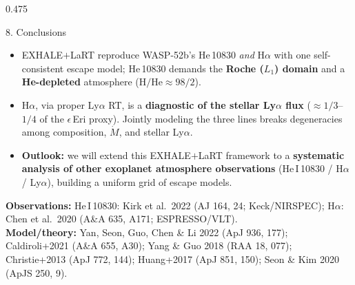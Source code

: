 \documentclass[final]{beamer}
\newlength{\colht}\setlength{\colht}{0.848\paperheight}
\newcommand{\Mdot}{\dot{M}}
\begin{document}
\begin{frame}[t]{}
\begin{columns}[t]
\begin{column}{0.475\paperwidth}
\begin{minipage}[t][\colht][s]{\linewidth}
\begin{block}{8. Conclusions}
\begin{itemize}
\item EXHALE$+$LaRT reproduce WASP-52b's He\,10830 \emph{and} H$\alpha$ with one
  self-consistent escape model; He\,10830 demands the \textbf{Roche ($L_1$) domain}
  and a \textbf{He-depleted} atmosphere ($\mathrm{H/He}\approx98/2$).
\item H$\alpha$, via proper Ly$\alpha$ RT, is a \textbf{diagnostic of the stellar
  Ly$\alpha$ flux} ($\approx1/3$--$1/4$ of the $\epsilon$\,Eri proxy). Jointly modeling the
  three lines breaks degeneracies among composition, $\Mdot$, and stellar Ly$\alpha$.
\item \textbf{Outlook:} we will extend this EXHALE$+$LaRT framework to a
  \textbf{systematic analysis of other exoplanet atmosphere observations}
  (He\,I\,10830 / H$\alpha$ / Ly$\alpha$), building a uniform grid of escape models.
\end{itemize}
\vspace{1mm}
{\scriptsize\textbf{Observations:} He\,I\,10830: Kirk et al.\ 2022 (AJ 164, 24;
Keck/NIRSPEC); H$\alpha$: Chen et al.\ 2020 (A\&A 635, A171; ESPRESSO/VLT).\\
\textbf{Model/theory:} Yan, Seon, Guo, Chen \& Li 2022 (ApJ 936, 177);
Caldiroli+2021 (A\&A 655, A30); Yang \& Guo 2018 (RAA 18, 077); Christie+2013
(ApJ 772, 144); Huang+2017 (ApJ 851, 150); Seon \& Kim 2020 (ApJS 250, 9).}
\end{block}

\end{minipage}
\end{column}
\end{columns}
\end{frame}
\end{document}
